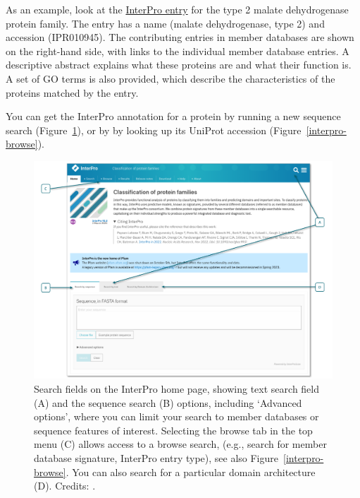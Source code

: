 As an example, look at the \href{https://www.ebi.ac.uk/interpro/entry/InterPro/IPR010945/}{InterPro entry} for the type 2 malate dehydrogenase protein family.
The entry has a name (malate dehydrogenase, type 2) and accession (IPR010945).
The contributing entries in member databases are shown on the right-hand side, with links to the individual member database entries.
A descriptive abstract explains what these proteins are and what their function is.
A set of GO terms is also provided, which describe the characteristics of the proteins matched by the entry.

You can get the InterPro annotation for a protein by running a new sequence search (Figure~\ref{interpro-search}), or by by looking up its UniProt accession (Figure~\ref{interpro-browse}).

\begin{figure}[!htbp]
\centering
\includegraphics[width=1\linewidth]{files/interpro-search-6c154991474b34bbe8ce014cfbd76ce3.png}
\caption[]{Search fields on the InterPro home page, showing text search field (A) and the sequence search (B) options, including `Advanced options', where you can limit your search to member databases or sequence features of interest.
Selecting the browse tab in the top menu (C) allows access to a browse search, (e.g., search for member database signature, InterPro entry type), see also Figure~\ref{interpro-browse}.
You can also search for a particular domain architecture (D).
Credits: \cite{interpro_2022}.}
\label{interpro-search}
\end{figure}

